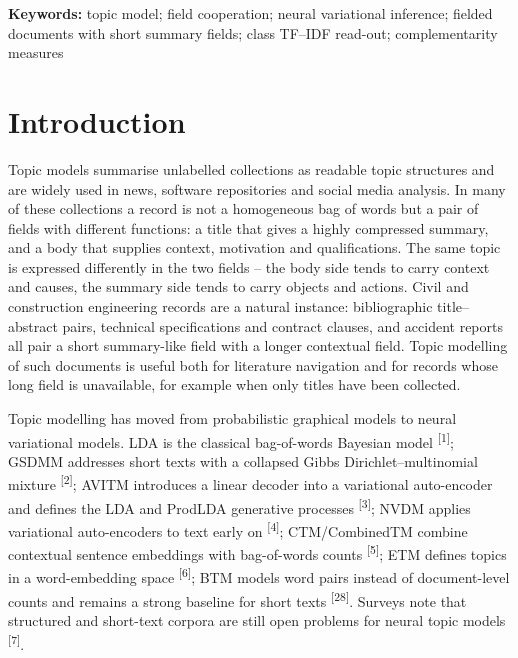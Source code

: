 \documentclass{article}
\begin{document}
\noindent\textbf{Keywords:} topic model; field cooperation; neural variational inference;
fielded documents with short summary fields; class TF--IDF read-out; complementarity measures

\section{Introduction}

Topic models summarise unlabelled collections as readable topic structures and are widely used in
news, software repositories and social media analysis. In many of these collections a record is not
a homogeneous bag of words but a pair of fields with different functions: a title that gives a
highly compressed summary, and a body that supplies context, motivation and qualifications. The
same topic is expressed differently in the two fields -- the body side tends to carry context and
causes, the summary side tends to carry objects and actions. Civil and construction engineering
records are a natural instance: bibliographic title--abstract pairs, technical specifications and
contract clauses, and accident reports all pair a short summary-like field with a longer contextual
field. Topic modelling of such documents is useful both for literature navigation and for records
whose long field is unavailable, for example when only titles have been collected.

Topic modelling has moved from probabilistic graphical models to neural variational models. LDA is
the classical bag-of-words Bayesian model \textsuperscript{[1]}; GSDMM addresses short texts with a
collapsed Gibbs Dirichlet--multinomial mixture \textsuperscript{[2]}; AVITM introduces a linear
decoder into a variational auto-encoder and defines the LDA and ProdLDA generative processes
\textsuperscript{[3]}; NVDM applies variational auto-encoders to text early on
\textsuperscript{[4]}; CTM/CombinedTM combine contextual sentence embeddings with bag-of-words
counts \textsuperscript{[5]}; ETM defines topics in a word-embedding space \textsuperscript{[6]};
BTM models word pairs instead of document-level counts and remains a strong baseline for short
texts \textsuperscript{[28]}. Surveys note that structured and short-text corpora are still open
problems for neural topic models \textsuperscript{[7]}.
\end{document}
